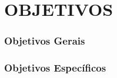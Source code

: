 \captionsetup{justification=centering,margin=0cm}

\chapter[OBJETIVOS]{OBJETIVOS}
\label{cap:objetivos}

\subsection{Objetivos Gerais}


\subsection{Objetivos Específicos}

